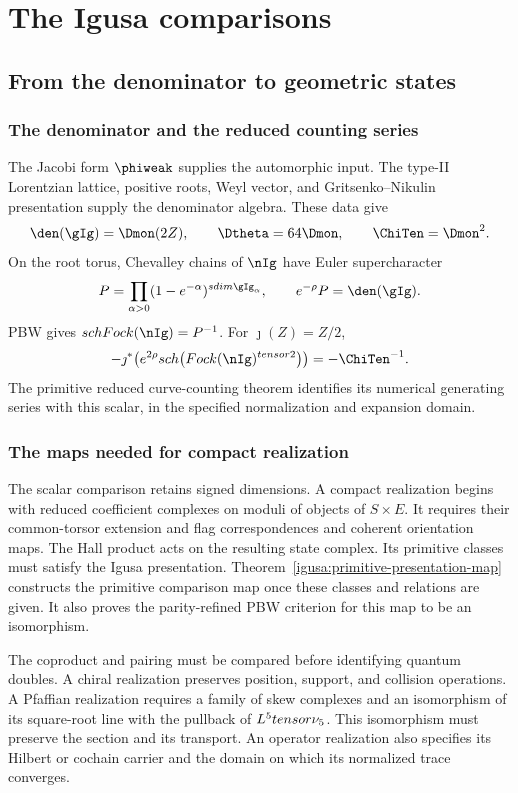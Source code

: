 \part{The Igusa comparisons}
\chapter{From the denominator to geometric states}
\section{The denominator and the reduced counting series}
The Jacobi form \(\phiweak\) supplies the automorphic input.
The type-II Lorentzian lattice, positive roots, Weyl vector, and
Gritsenko--Nikulin presentation supply the denominator algebra.
These data give
\[
 \den(\gIg)=\Dmon(2Z),\qquad
 \Dtheta=64\Dmon,\qquad \ChiTen=\Dmon^2.
\]
On the root torus, Chevalley chains of \(\nIg\) have Euler
supercharacter
\[
 P=\prod_{\alpha>0}(1-e^{-\alpha})^{\sdim\gIg_\alpha},
 \qquad e^{-\rho}P=\den(\gIg).
\]
PBW gives \(\sch\Fock(\nIg)=P^{-1}\). For \(\jmath(Z)=Z/2\),
\[
 -\jmath^*\!\left(e^{2\rho}
    \sch\bigl(\Fock(\nIg)^{\tensor2}\bigr)\right)
 =-\ChiTen^{-1}.
\]
The primitive reduced curve-counting theorem identifies its
numerical generating series with this scalar, in the specified
normalization and expansion domain.

\section{The maps needed for compact realization}
The scalar comparison retains signed dimensions. A compact
realization begins with reduced coefficient complexes on moduli
of objects of \(S\times E\). It requires their common-torsor
extension and flag correspondences and coherent orientation maps.
The Hall product acts on the resulting state complex. Its primitive
classes must satisfy the Igusa presentation.
Theorem~\ref{igusa:primitive-presentation-map} constructs the
primitive comparison map once these classes and relations are
given. It also proves the parity-refined PBW criterion for this map
to be an isomorphism.

The coproduct and pairing must be compared before identifying
quantum doubles. A chiral realization preserves position, support,
and collision operations. A Pfaffian realization requires a family
of skew complexes and an isomorphism of its square-root line with
the pullback of \(L^5tensor\nu_5\).
This isomorphism must preserve the section and its transport.
An operator realization also specifies its Hilbert or cochain
carrier and the domain on which its normalized trace converges.

